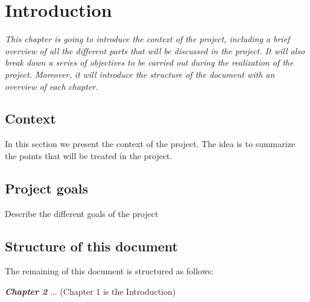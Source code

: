 \chapter{Introduction}

\textit{
This chapter is going to introduce the context of the project, including a brief overview of all the different parts that will be discussed in the project. It will also break down a series of objectives to be carried out during the realization of the project. Moreover, it will introduce the structure of the document with an overview of each chapter.}



\clearpage

\section{Context}

In this section we present the context of the project. The idea is to summarize the points that will be treated in the project.

\clearpage

\section{Project goals}

Describe the different goals of the project


\clearpage

\section{Structure of this document}

The remaining of this document is structured as follows:

\textbf{\textit{Chapter 2}} ... (Chapter 1 is the Introduction)